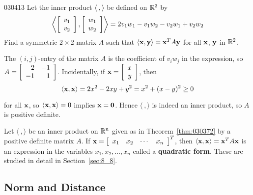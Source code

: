 \begin{example}{}{030413}
Let the inner product $\langle\ , \rangle$ be defined on $\mathbb{R}^2$ by
\begin{equation*}
\left \langle 
\left[ \begin{array}{c}
v_1 \\
v_2
\end{array} \right], \left[ \begin{array}{c}
w_1 \\
w_2
\end{array} \right]
\right \rangle
= 2v_1w_1 - v_1w_2 - v_2w_1 + v_2w_2
\end{equation*}
Find a symmetric $2 \times 2$ matrix $A$ such that $\langle\textbf{x}, \textbf{y}\rangle = \textbf{x}^{T}A\textbf{y}$ for all $\textbf{x}$, $\textbf{y}$ in $\mathbb{R}^2$.

\begin{solution}
The $(i, j)$-entry of the matrix $A$ is the coefficient of $v_{i}w_{j}$ in the expression, so 
$ A =
\left[ \begin{array}{rr}
2 & -1 \\
-1 & 1
\end{array} \right]$. Incidentally, if 
$\textbf{x} = 
\left[ \begin{array}{r}
x \\
y
\end{array} \right]$, then
\begin{equation*}
\langle \textbf{x}, \textbf{x} \rangle = 2x^2 - 2xy + y^2 = x^2 +(x - y)^2 \geq 0
\end{equation*}

for all $\textbf{x}$, so $\langle\textbf{x}, \textbf{x}\rangle = 0$ implies
$\textbf{x} = \textbf{0}$. Hence $\langle\ , \rangle$ is indeed an inner product, so $A$ is positive definite.
\end{solution}
\end{example}

Let $\langle\ , \rangle$ be an inner product on $\mathbb{R}^n$ given as in Theorem~\ref{thm:030372} by a positive definite matrix $A$. If $\textbf{x} = 
\left[ \begin{array}{cccc}
x_1 & x_2 & \cdots & x_n
\end{array} \right]^T $, then $\langle\textbf{x}, \textbf{x}\rangle = \textbf{x}^{T}A\textbf{x}$ is an expression in the variables
$x_{1}, x_{2}, \dots, x_{n}$ called a \textbf{quadratic form}. These are studied in detail in Section~\ref{sec:8_8}.

\subsection*{Norm and Distance}

